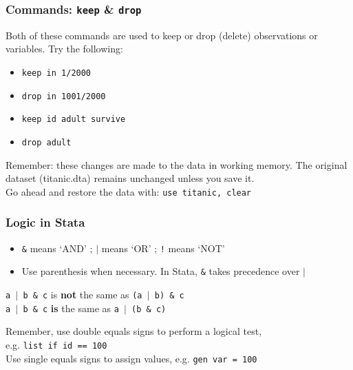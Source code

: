 \documentclass[11pt]{beamer}
\begin{document}
\begin{frame}
\frametitle{Commands: \texttt{keep} \& \texttt{drop}}
Both of these commands are used to keep or drop (delete) observations or variables. Try the following:
\begin{itemize}
	\item \texttt{keep in 1/2000}
	\item \texttt{drop in 1001/2000}
	\item \texttt{keep id adult survive}
	\item \texttt{drop adult}
\end{itemize} \pause \bigskip
Remember: these changes are made to the data in working memory. The original dataset (titanic.dta) remains unchanged unless you save it. \\ \pause \bigskip
Go ahead and restore the data with: \texttt{use titanic, clear}
\end{frame}

\begin{frame}
\frametitle{Logic in Stata}
\begin{itemize}
    \item \texttt{\&} means `AND' ; \texttt{$\vert$} means `OR' ; \texttt{!} means `NOT'
	\item Use parenthesis when necessary. In Stata, \texttt{\&} takes precedence over \texttt{$\vert$}
\end{itemize} \pause
\begin{center}
	\texttt{a $\vert$ b \& c} is \textbf{not} the same as \texttt{(a $\vert$ b) \& c} \\ \bigskip \pause
	\texttt{a $\vert$ b \& c} \textbf{is} the same as \texttt{a $\vert$ (b \& c)}
\end{center} \pause \bigskip
Remember, use double equals signs to perform a logical test, \\ e.g. \texttt{list if id == 100} \\ \pause \bigskip
Use single equals signs to assign values, e.g. \texttt{gen var = 100}
\end{frame}

\end{document}
